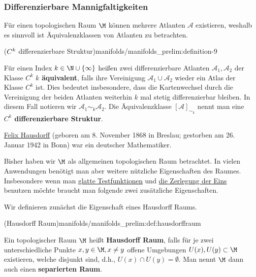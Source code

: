\documentclass[letterpaper,10pt,german]{jupyterBook}
\begin{document}
\subsubsection{Differenzierbare Mannigfaltigkeiten}
\label{\detokenize{manifolds/manifolds_prelim:differenzierbare-mannigfaltigkeiten}}
\par
Für einen topologischen Raum \(\M\) können mehrere Atlanten \(\mathcal{A}\) existieren, weshalb es sinnvoll ist Äquivalenzklassen von Atlanten zu betrachten.
\begin{definition}{(\protect\(C^k\protect\) differenzierbare Struktur)}{manifolds/manifolds_prelim:definition-9}



\par
Für einen Index \(k\in \N \cup \{\infty\}\) heißen zwei differenzierbare Atlanten \(\mathcal{A}_1, \mathcal{A}_2\) der Klasse \(C^k\) \textbf{\(k\) äquivalent}, falls ihre Vereinigung \(\mathcal{A}_1\cup \mathcal{A}_2\) wieder ein Atlas der Klasse \(C^k\) ist.
Dies bedeutet insbesondere, dass die Kartenwechsel durch die Vereinigung der beiden Atlanten weiterhin \(k\) mal stetig differenzierbar bleiben.
In diesem Fall notieren wir \(\mathcal{A}_1\sim_k \mathcal{A}_2\).
Die Äquivalenzklasse \([\mathcal{A}]_{\sim_k}\) nennt man eine \textbf{\(C^k\) differenzierbare Struktur}.
\end{definition}

\begin{emphBox}{}{}

\par
\href{https://de.wikipedia.org/wiki/Felix\_Hausdorff}{Felix Hausdorff} (geboren am 8. November 1868 in Breslau; gestorben am 26. Januar 1942 in Bonn) war ein deutscher Mathematiker.
\end{emphBox}

\par
Bisher haben wir \(\M\) als allgemeinen topologischen Raum betrachtet.
In vielen Anwendungen benötigt man aber weitere nützliche Eigenschaften des Raumes.
Insbesondere wenn man \href{https://de.wikipedia.org/wiki/Testfunktion}{glatte Testfunktionen} und \href{https://en.wikipedia.org/wiki/Partition\_of\_unity}{die Zerlegung der Eins} benutzen möchte braucht man folgende zwei zusätzliche Eigenschaften.

\par
Wir definieren zunächst die Eigenschaft eines Hausdorff Raums.
\begin{definition}{(Hausdorff Raum)}{manifolds/manifolds_prelim:def:hausdorffraum}



\par
Ein topologischer Raum \(\M\) heißt \textbf{Hausdorff Raum}, falls für je zwei unterschiedliche Punkte \(x,y\in \M, x\neq y\) offene Umgebungen \(U(x), U(y) \subset \M\) existieren, welche disjunkt sind, d.h., \(U(x)\cap U(y) = \emptyset\).
Man nennt \(\M\) dann auch einen \textbf{separierten Raum}.
\end{definition}
\end{document}
